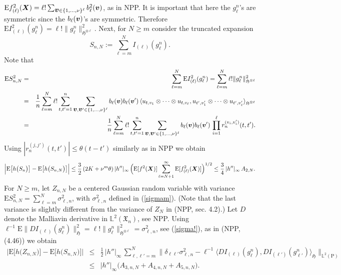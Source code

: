 \documentclass[10pt]{article}
\def\L{\mathbb{L}}
\def\E{\mathrm E}
\def\P{\mathrm P}
\newcommand{\mbf}[1]{\mbox{\boldmath $#1$}}
\newcommand{\HH}{\mathfrak{H}}
\newcommand{\Cov}{\mbox{Cov}}
\def\Cov{\mathrm{Cov}}
\begin{document}
$\E f^2_{(\ell)}({\mbf X}) = \ell! \sum_{{\mbf v}\in \{1, \ldots, \nu\}^\ell } b^2_\ell({\mbf v}) $, as in NPP.
It is important that here the $g_\ell^n$'s are symmetric since the $b_\ell ({\mbf v})$'s are symmetric. Therefore
$\E I^2_{(\ell)}(g_\ell^n) = \ell!  \|g_\ell^n\|^2_{\HH^{\otimes \ell}}$.
Next,
for $N\geq m$ consider the truncated expansion
$$
S_{n,N}:= \sum_{\ell =m}^N I_{(\ell)}(g_\ell^n).
$$
Note that
\begin{eqnarray*}
\E S^2_{n,N}&=&\sum_{\ell = m}^N  \E I^2_{(\ell)}(g_\ell^n)  = \sum_{\ell = m}^N \ell! \|g_\ell^n\|^2_{\HH^{\otimes \ell}} \nonumber \\
&=&\frac{1}{n}\sum_{\ell = m}^N \ell!
\sum_{t,t'=1}^n \sum_{{\mbf v}, {\mbf v}'\in \{1, \ldots, \nu\}^\ell } b_\ell({\mbf v}) b_\ell({\mbf v}')\,
\langle u_{t,v_1} \otimes \cdots
\otimes u_{t,v_\ell}, u_{t',v'_1} \otimes \cdots
\otimes u_{t',v'_\ell} \rangle_{\HH^{\otimes \ell}} \nonumber \\
&=&\frac{1}{n}\sum_{\ell = m}^N \ell!
\sum_{t,t'=1}^n \sum_{{\mbf v}, {\mbf v}'\in \{1, \ldots, \nu\}^\ell } b_\ell({\mbf v}) b_\ell({\mbf v}')\,
\prod_{i=1}^\ell
r^{(v_i,v'_i)}_n (t,t'). \label{sigma!}
\end{eqnarray*}
Using $|r_n^{(j,j')}(t,t')|\leq \theta(t-t')$  similarly as in NPP we obtain
\begin{eqnarray}\label{SNn}
\Big|\E \big [h\big (S_n\big) \big]-\E \big [h\big (S_{n,N}\big)\big]\Big| \leq \frac 3 2 \, (2K + \nu^m \theta )\,  |h''|_{\infty} \,\Big ( \E[f^2({\mbf X})]\sum_{\ell=N+1}^\infty \E[f^2_{(\ell)}({\mbf X})]\Big )^{1/2}\leq \frac 3 4 \,|h''|_{\infty} \, A_{2,N}.
\end{eqnarray}
For $N\geq m$, let $Z_{n,N}$ be a
centered Gaussian random variable with variance $\E S^2_{n,N} =  \sum_{\ell=m}^N \sigma^2_{\ell,n}$, with
$\sigma^2_{\ell,n} $
defined in (\ref{sigmam}). (Note that the last variance is slightly different from the variance of $Z_N$ in (NPP, sec. 4.2).)
Let $D$ denote the Malliavin derivative in $\L^2({\mathfrak X}_n)$, see NPP.
Using $\ell^{-1} \E \| D I_{(\ell)}(g_\ell^n)\|^2_{\HH} = \ell! \|g_\ell^n\|^2_{\HH^{\otimes \ell}}
= \sigma^2_{\ell, n}$, see (\ref{sigma!}), as in (NPP, (4.46)) we obtain
\begin{eqnarray}
\nonumber \Big| \E \big [h\big ( Z_{n,N} \big) \big ]-\E \big [h\big ( S_{n,N}\big) \big ] \Big|
&\leq & \frac 1 2 \, |h''|_\infty \,\sum_{\ell, \ell'=m}^N \big \|\delta_{\ell \ell'} \sigma^2_{\ell,n} -
\ell^{-1} \langle D I_{(\ell)}(g_\ell^n), D I_{(\ell')}(g_{\ell'}^n)\rangle_{\HH}   \big \| _{\L^2(\P)} \nonumber \\
&\le&|h''|_\infty \big(A_{3,n,N} + A_{4,n,N} + A_{5,n,N}\big).
\label{ZN}
\end{eqnarray}
\end{document}
